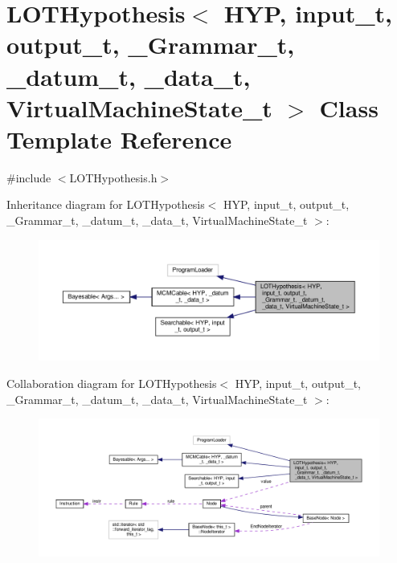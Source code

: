\hypertarget{class_l_o_t_hypothesis}{}\section{L\+O\+T\+Hypothesis$<$ H\+YP, input\+\_\+t, output\+\_\+t, \+\_\+\+Grammar\+\_\+t, \+\_\+datum\+\_\+t, \+\_\+data\+\_\+t, Virtual\+Machine\+State\+\_\+t $>$ Class Template Reference}
\label{class_l_o_t_hypothesis}


{\ttfamily \#include $<$L\+O\+T\+Hypothesis.\+h$>$}



Inheritance diagram for L\+O\+T\+Hypothesis$<$ H\+YP, input\+\_\+t, output\+\_\+t, \+\_\+\+Grammar\+\_\+t, \+\_\+datum\+\_\+t, \+\_\+data\+\_\+t, Virtual\+Machine\+State\+\_\+t $>$\+:
\nopagebreak
\begin{figure}[H]
\begin{center}
\leavevmode
\includegraphics[width=350pt]{class_l_o_t_hypothesis__inherit__graph}
\end{center}
\end{figure}


Collaboration diagram for L\+O\+T\+Hypothesis$<$ H\+YP, input\+\_\+t, output\+\_\+t, \+\_\+\+Grammar\+\_\+t, \+\_\+datum\+\_\+t, \+\_\+data\+\_\+t, Virtual\+Machine\+State\+\_\+t $>$\+:
\nopagebreak
\begin{figure}[H]
\begin{center}
\leavevmode
\includegraphics[width=350pt]{class_l_o_t_hypothesis__coll__graph}
\end{center}
\end{figure}
